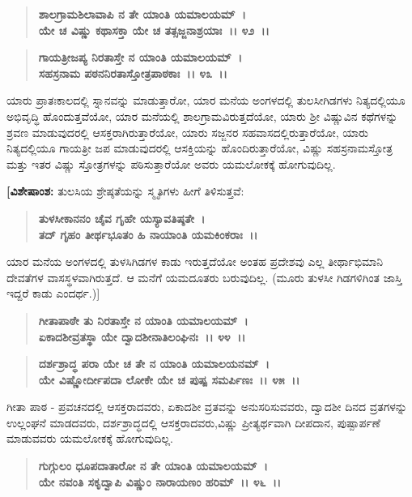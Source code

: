 \begin{verse}
\textbf{ಶಾಲಗ್ರಾಮಶಿಲಾವಾಪಿ ನ ತೇ ಯಾಂತಿ ಯಮಾಲಯಮ್~।}\\\textbf{ಯೇ ಚ ವಿಷ್ಣು ಕಥಾಸಕ್ತಾ ಯೇ ಚ ತತ್ಸಜ್ಜನಾಶ್ರಯಾಃ~।। ೪೨~।।}
\end{verse}

\begin{verse}
\textbf{ಗಾಯತ್ರೀಜಪ್ಯ ನಿರತಾಸ್ತೇ ನ ಯಾಂತಿ ಯಮಾಲಯಮ್~।}\\\textbf{ಸಹಸ್ರನಾಮ ಪಠನನಿರತಾಸ್ತೋತ್ರಪಾಠಕಾಃ~।। ೪೩~।।}
\end{verse}

ಯಾರು ಪ್ರಾತಃಕಾಲದಲ್ಲಿ ಸ್ನಾನವನ್ನು ಮಾಡುತ್ತಾರೋ, ಯಾರ ಮನೆಯ ಅಂಗಳದಲ್ಲಿ ತುಲಸೀಗಿಡಗಳು ನಿತ್ಯದಲ್ಲಿಯೂ ಅಭಿವೃದ್ಧಿ ಹೊಂದುತ್ತವೆಯೋ, ಯಾರ ಮನೆಯಲ್ಲಿ ಶಾಲಗ್ರಾಮವಿರುತ್ತದೆಯೋ, ಯಾರು ಶ‍್ರೀ ವಿಷ್ಣುವಿನ ಕಥೆಗಳನ್ನು ಶ್ರವಣ ಮಾಡುವುದರಲ್ಲಿ ಆಸಕ್ತರಾಗಿರುತ್ತಾರೆಯೋ, ಯಾರು ಸಜ್ಜನರ ಸಹವಾಸದಲ್ಲಿರುತ್ತಾರೆಯೋ, ಯಾರು ನಿತ್ಯದಲ್ಲಿಯೂ ಗಾಯತ್ರೀ ಜಪ ಮಾಡುವುದರಲ್ಲಿ ಆಸಕ್ತಿಯನ್ನು ಹೊಂದಿರುತ್ತಾರೆಯೋ, ವಿಷ್ಣು ಸಹಸ್ರನಾಮಸ್ತೋತ್ರ ಮತ್ತು ಇತರ ವಿಷ್ಣು ಸ್ತೋತ್ರಗಳನ್ನು ಪಠಿಸುತ್ತಾರೆಯೋ ಅವರು ಯಮಲೋಕಕ್ಕೆ ಹೋಗುವುದಿಲ್ಲ.

\textbf{[ವಿಶೇಷಾಂಶ:} ತುಲಸಿಯ ಶ್ರೇಷ್ಠತೆಯನ್ನು ಸ್ಮೃತಿಗಳು ಹೀಗೆ ತಿಳಿಸುತ್ತವೆ:

\begin{verse}
\textbf{ತುಳಸೀಕಾನನಂ ಚೈವ ಗೃಹೇ ಯಸ್ಯಾವತಿಷ್ಠತೇ~।}\\\textbf{ತದ್ ಗೃಹಂ ತೀರ್ಥಭೂತಂ ಹಿ ನಾಯಾಂತಿ ಯಮಕಿಂಕರಾಃ~।।}
\end{verse}

ಯಾರ ಮನೆಯ ಅಂಗಳದಲ್ಲಿ ತುಳಸಿಗಿಡಗಳ ಕಾಡು ಇರುತ್ತದೆಯೋ ಅಂತಹ ಪ್ರದೇಶವು ಎಲ್ಲ ತೀರ್ಥಾಭಿಮಾನಿ ದೇವತೆಗಳ ವಾಸಸ್ಥಳವಾಗಿರುತ್ತದೆ. ಆ ಮನೆಗೆ ಯಮದೂತರು ಬರುವುದಿಲ್ಲ. (ಮೂರು ತುಳಸೀ ಗಿಡಗಳಿಗಿಂತ ಜಾಸ್ತಿ ಇದ್ದರೆ ಕಾಡು ಎಂದರ್ಥ.)]

\begin{verse}
\textbf{ಗೀತಾಪಾಠೇ ತು ನಿರತಾಸ್ತೇ ನ ಯಾಂತಿ ಯಮಾಲಯಮ್~।}\\\textbf{ಏಕಾದಶೀವ್ರತಸ್ಥಾ ಯೇ ದ್ವಾದಶೀನಾತಿಲಂಘಿನಃ~।। ೪೪~।।} 
\end{verse}

\begin{verse}
\textbf{ದರ್ಶಶ್ರಾದ್ಧ ಪರಾ ಯೇ ಚ ತೇ ನ ಯಾಂತಿ ಯಮಾಲಯನಮ್~।}\\\textbf{ಯೇ ವಿಷ್ಣೋರ್ದೀಪದಾ ಲೋಕೇ ಯೇ ಚ ಪುಷ್ಪ ಸಮರ್ಪಿಣಃ~।। ೪೫~।। }
\end{verse}

ಗೀತಾ ಪಾಠ - ಪ್ರವಚನದಲ್ಲಿ ಆಸಕ್ತರಾದವರು, ಏಕಾದಶೀ ವ್ರತವನ್ನು ಅನುಸರಿಸುವವರು, ದ್ವಾದಶೀ ದಿನದ ವ್ರತಗಳನ್ನು ಉಲ್ಲಂಘನೆ ಮಾಡದವರು, ದರ್ಶಶ್ರಾದ್ಧದಲ್ಲಿ ಆಸಕ್ತರಾದವರು,ವಿಷ್ಣು ಪ್ರೀತ್ಯರ್ಥವಾಗಿ ದೀಪದಾನ, ಪುಷ್ಪಾರ್ಪಣೆ ಮಾಡುವವರು ಯಮಲೋಕಕ್ಕೆ ಹೋಗುವುದಿಲ್ಲ.

\begin{verse}
\textbf{ಗುಗ್ಗುಲಂ ಧೂಪದಾತಾರೋ ನ ತೇ ಯಾಂತಿ ಯಮಾಲಯಮ್~।}\\\textbf{ಯೇ ನವಂತಿ ಸಕೃದ್ವಾಪಿ ವಿಷ್ಣುಂ ನಾರಾಯಣಂ ಹರಿಮ್~।। ೪೬~।। }
\end{verse}

